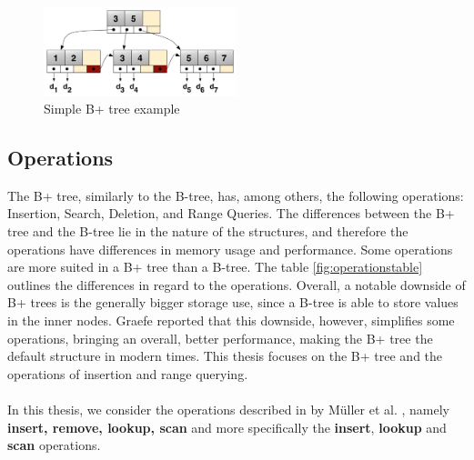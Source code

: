 \begin{figure}[h]
  \centering
  \includegraphics[width=0.5\textwidth]{images/Bplustree.png}
  \caption{Simple B+ tree example \parencite{wikib+tree}}
  \label{fig:b+treeexample}
\end{figure}
 
\subsection{Operations}
The B+ tree, similarly to the B-tree, has, among others, the following operations: Insertion, Search, Deletion, and Range Queries. The differences between the B+ tree and the B-tree lie in the nature of the structures, and therefore the operations have differences in memory usage and performance. Some operations are more suited in a B+ tree than a B-tree. The table \ref{fig:operationstable} outlines the differences in regard to the operations. Overall, a notable downside of B+ trees is the generally bigger storage use, since a B-tree is able to store values in the inner nodes. Graefe \parencite{modernbtree} reported that this downside, however, simplifies some operations, bringing an overall, better performance, making the B+ tree the default structure in modern times. This thesis focuses on the B+ tree and the operations of insertion and range querying. 
\\\\
In this thesis, we consider the operations described in by Müller et al. \parencite{mueller2024}, namely \textbf{insert, remove, lookup, scan} and more specifically the \textbf{insert}, \textbf{lookup} and \textbf{scan} operations.

